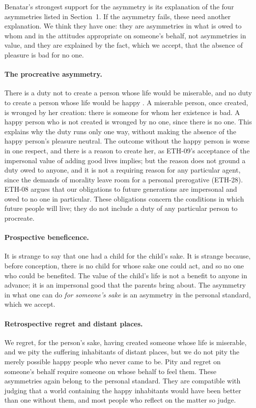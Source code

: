 \documentclass{situationist-preprint}
\begin{document}
Benatar's strongest support for the asymmetry is its explanation of the four asymmetries listed in Section~1. If the asymmetry fails, these need another explanation. We think they have one: they are asymmetries in what is owed to whom and in the attitudes appropriate on someone's behalf, not asymmetries in value, and they are explained by the fact, which we accept, that the absence of pleasure is bad for no one.

\paragraph{The procreative asymmetry.} There is a duty not to create a person whose life would be miserable, and no duty to create a person whose life would be happy \citep{Narveson1973,McMahan1981}. A miserable person, once created, is wronged by her creation: there is someone for whom her existence is bad. A happy person who is not created is wronged by no one, since there is no one. This explains why the duty runs only one way, without making the absence of the happy person's pleasure neutral. The outcome without the happy person is worse in one respect, and there is a reason to create her, as ETH-09's acceptance of the impersonal value of adding good lives implies; but the reason does not ground a duty owed to anyone, and it is not a requiring reason for any particular agent, since the demands of morality leave room for a personal prerogative (ETH-28). ETH-08 argues that our obligations to future generations are impersonal and owed to no one in particular. These obligations concern the conditions in which future people will live; they do not include a duty of any particular person to procreate.

\paragraph{Prospective beneficence.} It is strange to say that one had a child for the child's sake. It is strange because, before conception, there is no child for whose sake one could act, and so no one who could be benefited. The value of the child's life is not a benefit to anyone in advance; it is an impersonal good that the parents bring about. The asymmetry in what one can do \emph{for someone's sake} is an asymmetry in the personal standard, which we accept.

\paragraph{Retrospective regret and distant places.} We regret, for the person's sake, having created someone whose life is miserable, and we pity the suffering inhabitants of distant places, but we do not pity the merely possible happy people who never came to be. Pity and regret on someone's behalf require someone on whose behalf to feel them. These asymmetries again belong to the personal standard. They are compatible with judging that a world containing the happy inhabitants would have been better than one without them, and most people who reflect on the matter so judge.
\end{document}
